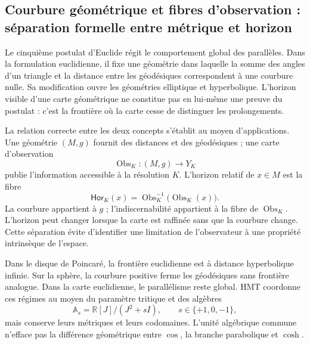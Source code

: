 \subsection{Courbure géométrique et fibres d'observation : séparation formelle entre métrique et horizon}

Le cinquième postulat d'Euclide régit le comportement global des
parallèles. Dans la formulation euclidienne, il fixe une géométrie dans laquelle la somme des
angles d'un triangle et la distance entre les géodésiques correspondent à une
courbure nulle. Sa modification ouvre les géométries elliptique et hyperbolique.
L'horizon visible d'une carte géométrique ne constitue pas en lui-même une
preuve du postulat : c'est la frontière où la carte cesse de distinguer les
prolongements.

La relation correcte entre les deux concepts s'établit au moyen d'applications. Une
géométrie \((M,g)\) fournit des distances et des géodésiques ; une carte
d'observation
\begin{equation}\label{p12-83-c0-s2:eq:amp-carta-horizonte}
 \operatorname{Obs}_{K}:(M,g)\longrightarrow Y_K
\end{equation}
publie l'information accessible à la résolution \(K\). L'horizon relatif
de \(x\in M\) est la fibre
\begin{equation}\label{p12-83-c0-s2:eq:amp-fibra-horizonte}
 \mathsf{Hor}_K(x)=\operatorname{Obs}_K^{-1}
 \bigl(\operatorname{Obs}_K(x)\bigr).
\end{equation}
La courbure appartient à \(g\) ; l'indiscernabilité appartient à la fibre
de \(\operatorname{Obs}_K\). L'horizon peut changer lorsque la carte est raffinée
sans que la courbure change. Cette séparation évite d'identifier une
limitation de l'observateur à une propriété intrinsèque de l'espace.

Dans le disque de Poincaré, la frontière euclidienne est à distance hyperbolique
infinie. Sur la sphère, la courbure positive ferme les géodésiques sans
frontière analogue. Dans la carte euclidienne, le parallélisme reste global. HMT
coordonne ces régimes au moyen du paramètre tritique et des algèbres
\begin{equation}\label{p12-83-c0-s2:eq:amp-tres-regimenes}
 \mathbb A_s=\mathbb R[J]/(J^2+sI),
 \qquad s\in\{+1,0,-1\},
\end{equation}
mais conserve leurs métriques et leurs codomaines. L'unité algébrique commune n'efface pas
la différence géométrique entre \(\cos\), la branche parabolique et \(\cosh\).

